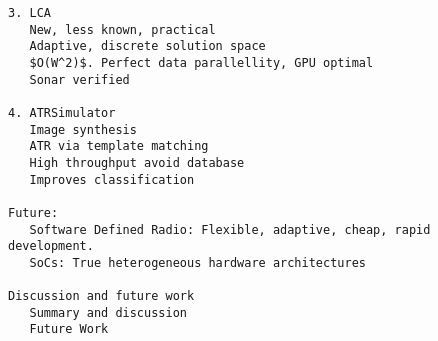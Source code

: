 \begin{lstlisting}
3. LCA
   New, less known, practical
   Adaptive, discrete solution space
   $O(W^2)$. Perfect data parallellity, GPU optimal
   Sonar verified
   
4. ATRSimulator
   Image synthesis
   ATR via template matching
   High throughput avoid database
   Improves classification
   
Future:
   Software Defined Radio: Flexible, adaptive, cheap, rapid development.
   SoCs: True heterogeneous hardware architectures
   
Discussion and future work
   Summary and discussion
   Future Work
\end{lstlisting}




%
%
%
%
%
%
%
%
%
%
%



